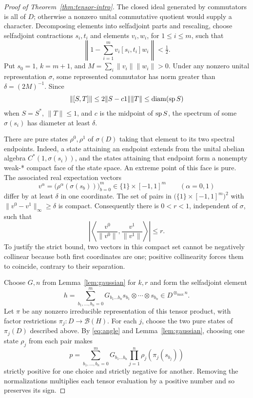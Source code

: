 \begin{proof}[Proof of Theorem~\ref{thm:tensor-intro}]
The closed ideal generated by commutators is all of \(D\); otherwise a nonzero unital commutative quotient would supply a character. Decomposing elements into selfadjoint parts and rescaling, choose selfadjoint contractions \(s_i,t_i\) and elements \(v_i,w_i\), for \(1\leq i\leq m\), such that
\begin{equation}\label{eq:commutator}
 \left\|1-\sum_{i=1}^m v_i[s_i,t_i]w_i\right\|<\tfrac12.
\end{equation}
Put \(s_0=1\), \(k=m+1\), and
\(M=\sum_i\|v_i\|\|w_i\|>0\).
Under any nonzero unital representation \(\sigma\), some represented commutator has norm greater than \(\delta=(2M)^{-1}\). Since
\[
 \|[S,T]\|\leq2\|S-c1\|\|T\|
 \leq\operatorname{diam}(\operatorname{sp} S)
\]
when \(S=S^*\), \(\|T\|\leq1\), and \(c\) is the midpoint of \(\operatorname{sp} S\), the spectrum of some \(\sigma(s_i)\) has diameter at least \(\delta\).

There are pure states \(\rho^0,\rho^1\) of \(\sigma(D)\) taking that element to its two spectral endpoints. Indeed, a state attaining an endpoint extends from the unital abelian algebra \(C^*(1,\sigma(s_i))\), and the states attaining that endpoint form a nonempty weak-* compact face of the state space. An extreme point of this face is pure. The associated real expectation vectors
\[
 v^\alpha=\big(\rho^\alpha(\sigma(s_b))\big)_{b=0}^m
 \in\{1\}\times[-1,1]^m\qquad(\alpha=0,1)
\]
differ by at least \(\delta\) in one coordinate. The set of pairs in \(\big(\{1\}\times[-1,1]^m\big)^2\) with \(\|v^0-v^1\|_\infty\geq\delta\) is compact. Consequently there is \(0<r<1\), independent of \(\sigma\), such that
\begin{equation}\label{eq:angle}
 \left|\left\langle\frac{v^0}{\|v^0\|},\frac{v^1}{\|v^1\|}\right\rangle\right|\leq r.
\end{equation}
To justify the strict bound, two vectors in this compact set cannot be negatively collinear because both first coordinates are one; positive collinearity forces them to coincide, contrary to their separation.

Choose \(G,n\) from Lemma~\ref{lem:gaussian} for \(k,r\) and form the selfadjoint element
\begin{equation}\label{eq:h}
 h=\sum_{b_1,\ldots,b_n=0}^m G_{b_1\ldots b_n}
 s_{b_1}\otimes\cdots\otimes s_{b_n}
 \in D^{\otimes_{\max}n}.
\end{equation}
Let \(\pi\) be any nonzero irreducible representation of this tensor product, with factor restrictions \(\pi_j:D\to\mathcal B(H)\). For each \(j\), choose the two pure states of \(\pi_j(D)\) described above. By \eqref{eq:angle} and Lemma~\ref{lem:gaussian}, choosing one state \(\rho_j\) from each pair makes
\begin{equation}\label{eq:p}
 p=\sum_{b_1,\ldots,b_n=0}^mG_{b_1\ldots b_n}
 \prod_{j=1}^n\rho_j(\pi_j(s_{b_j}))
\end{equation}
strictly positive for one choice and strictly negative for another. Removing the normalizations multiplies each tensor evaluation by a positive number and so preserves its sign.


\end{proof}
